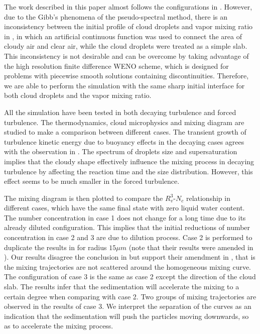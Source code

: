 \documentclass[draft,jgrga]{AGUTeX}
\begin{document}
\begin{article}
The work described in this paper almost follows the configurations in \cite{Kumar11}. However, due to the Gibb's phenomena of the pseudo-spectral method, there is an inconsistency between the initial profile of cloud droplets and vapor mixing ratio in \cite{Kumar11}, in which an artificial continuous function was used to connect the area of cloudy air and clear air, while the cloud droplets were treated as a simple slab. This inconsistency is not desirable and can be overcome by taking advantage of the high resolution finite difference WENO scheme, which is designed for problems with piecewise smooth solutions containing discontinuities. Therefore, we are able to perform the simulation with the same sharp initial interface for both cloud droplets and the vapor mixing ratio.

All the simulation have been tested in both decaying turbulence and forced turbulence. The thermodynamics, cloud microphysics and mixing diagram are studied to make a comparison between different cases. The transient growth of turbulence kinetic energy due to buoyancy effects in the decaying cases agrees with the observation in \cite{Kumar14}. The spectrum of droplets size and supersaturation implies that the cloudy shape effectively influence the mixing process in decaying turbulence by affecting the reaction time and the size distribution. However, this effect seems to be much smaller in the forced turbulence.

The mixing diagram is then plotted to compare the $R_v^3$-$N_c$ relationship in different cases, which have the same final state with zero liquid water content. The number concentration in case 1 does not change for a long time due to its already diluted configuration. This implies that the initial reductions of number concentration in case 2 and 3 are due to dilution process. Case 2 is performed to duplicate the results in \cite{Kumar14} for radius $15\mu m$ (note that their results were amended in \cite{Kumar16Corr}). Our results disagree the conclusion in \cite{Kumar14} but support their amendment in \cite{Kumar16Corr}, that is the mixing trajectories are not scattered around the homogeneous mixing curve. The configuration of case 3 is the same as case 2 except the direction of the cloud slab. The results infer that the sedimentation will accelerate the mixing to a certain degree when comparing with case 2. Two groups of mixing trajectories are observed in the results of case 3. We interpret the separation of the curves as an indication that the sedimentation will push the particles moving downwards, so as to accelerate the mixing process.


\end{article}
\end{document}
